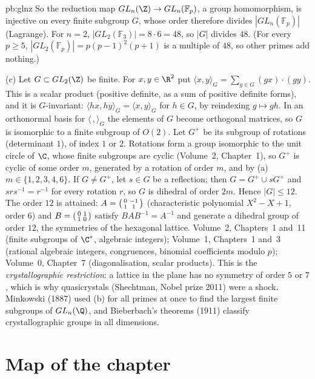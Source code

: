 \begin{solution}{pb:glnz}
So the reduction map $GL_n(\Z)\to GL_n(\mathbb F_p)$, a group homomorphism, is injective on every finite subgroup $G$, whose
order therefore divides $|GL_n(\mathbb F_p)|$ (Lagrange). For $n=2$, $|GL_2(\mathbb F_3)|=8\cdot6=48$, so $|G|$ divides $48$.
(For every $p\ge5$, $|GL_2(\mathbb F_p)|=p(p-1)^2(p+1)$ is a multiple of $48$, so other primes add nothing.)

(c) Let $G\subset GL_2(\Z)$ be finite. For $x,y\in\R^2$ put $\langle x,y\rangle_G=\sum_{g\in G}(gx)\cdot(gy)$. This is a scalar
product (positive definite, as a sum of positive definite forms), and it is $G$-invariant: $\langle hx,hy\rangle_G=\langle x,
y\rangle_G$ for $h\in G$, by reindexing $g\mapsto gh$. In an orthonormal basis for $\langle\,,\rangle_G$ the elements of $G$
become orthogonal matrices, so $G$ is isomorphic to a finite subgroup of $O(2)$. Let $G^+$ be its subgroup of rotations
(determinant $1$), of index $1$ or $2$. Rotations form a group isomorphic to the unit circle of $\C$, whose finite subgroups are
cyclic (Volume~2, Chapter~1), so $G^+$ is cyclic of some order $m$, generated by a rotation of order $m$, and by (a)
$m\in\{1,2,3,4,6\}$. If $G\ne G^+$, let $s\in G$ be a reflection; then $G=G^+\cup sG^+$ and $srs^{-1}=r^{-1}$ for every rotation
$r$, so $G$ is dihedral of order $2m$. Hence $|G|\le12$. The order $12$ is attained: $A=\begin{psmallmatrix}0&-1\\1&1
\end{psmallmatrix}$ (characteristic polynomial $X^2-X+1$, order $6$) and $B=\begin{psmallmatrix}0&1\\1&0\end{psmallmatrix}$
satisfy $BAB^{-1}=A^{-1}$ and generate a dihedral group of order $12$, the symmetries of the hexagonal lattice.
\tools Volume~2, Chapters~1 and~11 (finite subgroups of $\C^*$, algebraic integers); Volume~1, Chapters~1 and~3 (rational
algebraic integers, congruences, binomial coefficients modulo $p$); Volume~0, Chapter~7 (diagonalisation, scalar products).
\leads This is the \emph{crystallographic restriction}: a lattice in the plane has no symmetry of order $5$ or $7$, which is
why quasicrystals (Shechtman, Nobel prize 2011) were a shock. Minkowski (1887) used (b) for all primes at once to find the
largest finite subgroups of $GL_n(\Q)$, and Bieberbach's theorems (1911) classify crystallographic groups in all dimensions.
\end{solution}

\section*{Map of the chapter}


